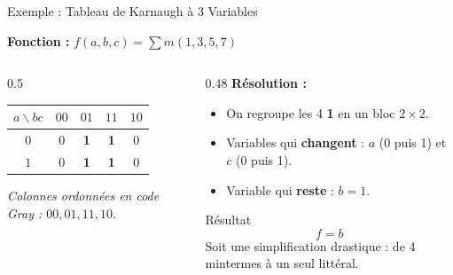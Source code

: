 \begin{frame}{Exemple : Tableau de Karnaugh à 3 Variables}

    \textbf{Fonction :} \(f(a,b,c) = \sum m(1,3,5,7)\)

    \vspace{0.3cm}

    \begin{columns}[T]
        \begin{column}{0.5\textwidth}
            \centering
            \renewcommand{\arraystretch}{1.6}
            \begin{tabular}{|c|c|c|c|c|}
                \hline
                \(a \backslash bc\) & \(00\) & \(01\) & \(11\) & \(10\) \\
                \hline
                \(0\) & 0 & \textbf{1} & \textbf{1} & 0 \\
                \hline
                \(1\) & 0 & \textbf{1} & \textbf{1} & 0 \\
                \hline
            \end{tabular}

            \vspace{0.3cm}

            \textit{Colonnes ordonnées en code Gray : \(00, 01, 11, 10\).}
        \end{column}
        \begin{column}{0.48\textwidth}
            \textbf{Résolution :}

            \vspace{0.3cm}

            \begin{itemize}
                \item On regroupe les 4 \textbf{1} en un bloc \(2 \times 2\).
                \item Variables qui \textbf{changent} : \(a\) (0 puis 1) et \(c\) (0 puis 1).
                \item Variable qui \textbf{reste} : \(b = 1\).
            \end{itemize}

            \vspace{0.4cm}

            \begin{exampleblock}{Résultat}
                \[
                    f = b
                \]
                Soit une simplification drastique : de 4 mintermes à un seul littéral.
            \end{exampleblock}
        \end{column}
    \end{columns}

\end{frame}
